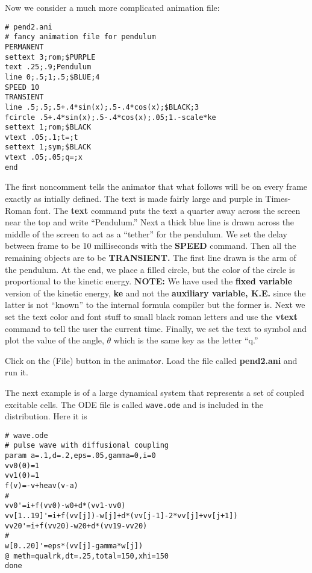 \documentclass{article}
\begin{document}
Now we consider a much more complicated animation file:
\begin{verbatim}
# pend2.ani
# fancy animation file for pendulum
PERMANENT
settext 3;rom;$PURPLE
text .25;.9;Pendulum
line 0;.5;1;.5;$BLUE;4
SPEED 10
TRANSIENT
line .5;.5;.5+.4*sin(x);.5-.4*cos(x);$BLACK;3
fcircle .5+.4*sin(x);.5-.4*cos(x);.05;1.-scale*ke
settext 1;rom;$BLACK
vtext .05;.1;t=;t
settext 1;sym;$BLACK
vtext .05;.05;q=;x
end
\end{verbatim}

The first noncomment tells the animator that what follows will be on
every frame exactly as intially defined. The text is made fairly large
and purple in Times-Roman font. The {\bf text} command puts the text a
quarter away across the screen near the top and write ``Pendulum.''
Next a thick blue line is drawn across the middle of the screen to act
as a ``tether'' for the pendulum.  We set the delay between frame to
be 10 milliseconds with the {\bf SPEED} command.  Then all the
remaining objects are to be {\bf TRANSIENT.} The first line drawn is
the arm of the pendulum. At the end, we place a filled circle, but the
color of the circle is proportional to the kinetic energy. {\bf NOTE:}
We have used the {\bf fixed variable} version of the kinetic energy,
{\bf ke}  and
not the {\bf auxiliary variable, K.E.} since the latter is not
``known'' to the internal formula compiler but the former is.
Next we set the text color and font stuff to small black roman letters
and use the {\bf vtext} command to tell the user the current
time. Finally, we set the text to symbol and plot the value of the
angle, $\theta$ which is the same key as the letter ``q.''

Click on the (File) button in the animator. Load the file called {\bf
pend2.ani} and run it.

\medskip

The next example is of a large dynamical system that represents a set
of coupled excitable cells. The ODE file is called {\tt wave.ode} and
is included in the distribution. Here it is
\begin{verbatim}
# wave.ode
# pulse wave with diffusional coupling
param a=.1,d=.2,eps=.05,gamma=0,i=0
vv0(0)=1
vv1(0)=1
f(v)=-v+heav(v-a)
#
vv0'=i+f(vv0)-w0+d*(vv1-vv0)
vv[1..19]'=i+f(vv[j])-w[j]+d*(vv[j-1]-2*vv[j]+vv[j+1])
vv20'=i+f(vv20)-w20+d*(vv19-vv20)
#
w[0..20]'=eps*(vv[j]-gamma*w[j])
@ meth=qualrk,dt=.25,total=150,xhi=150
done
\end{verbatim}
\end{document}

